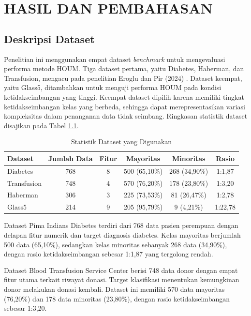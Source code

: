 \newpage
\chapter{HASIL DAN PEMBAHASAN} \label{Bab IV}

\section{Deskripsi Dataset} \label{IV.Deskripsi_dataset}
Penelitian ini menggunakan empat dataset \textit{benchmark} untuk mengevaluasi performa metode HOUM. Tiga dataset pertama, yaitu Diabetes, Haberman, dan Transfusion, mengacu pada penelitian Eroglu dan Pir (2024) \cite{Eroglu2024HOUM}. Dataset keempat, yaitu Glass5, ditambahkan untuk menguji performa HOUM pada kondisi ketidakseimbangan yang tinggi. Keempat dataset dipilih karena memiliki tingkat ketidakseimbangan kelas yang berbeda, sehingga dapat merepresentasikan variasi kompleksitas dalam penanganan data tidak seimbang. Ringkasan statistik dataset disajikan pada Tabel \ref{table:4.statistik_dataset}.

\begin{table}[H]
\centering
\caption{Statistik Dataset yang Digunakan}
\label{table:4.statistik_dataset}
\begin{tabular}{|l|c|c|c|c|c|}
\hline
\textbf{Dataset} & \textbf{Jumlah Data} & \textbf{Fitur} & \textbf{Mayoritas} & \textbf{Minoritas} & \textbf{Rasio} \\
\hline
Diabetes & 768 & 8 & 500 (65,10\%) & 268 (34,90\%) & 1:1,87 \\
\hline
Transfusion & 748 & 4 & 570 (76,20\%) & 178 (23,80\%) & 1:3,20 \\
\hline
Haberman & 306 & 3 & 225 (73,53\%) & 81 (26,47\%) & 1:2,78 \\
\hline
Glass5 & 214 & 9 & 205 (95,79\%) & 9 (4,21\%) & 1:22,78 \\
\hline
\end{tabular}
\end{table}

Dataset Pima Indians Diabetes terdiri dari 768 data pasien perempuan dengan delapan fitur numerik dan target diagnosis diabetes. Kelas mayoritas berjumlah 500 data (65,10\%), sedangkan kelas minoritas sebanyak 268 data (34,90\%), dengan rasio ketidakseimbangan sebesar 1:1,87 yang tergolong rendah. \par

Dataset Blood Transfusion Service Center berisi 748 data donor dengan empat fitur utama terkait riwayat donasi. Target klasifikasi menentukan kemungkinan donor melakukan donasi kembali. Dataset ini memiliki 570 data mayoritas (76,20\%) dan 178 data minoritas (23,80\%), dengan rasio ketidakseimbangan sebesar 1:3,20. \par

